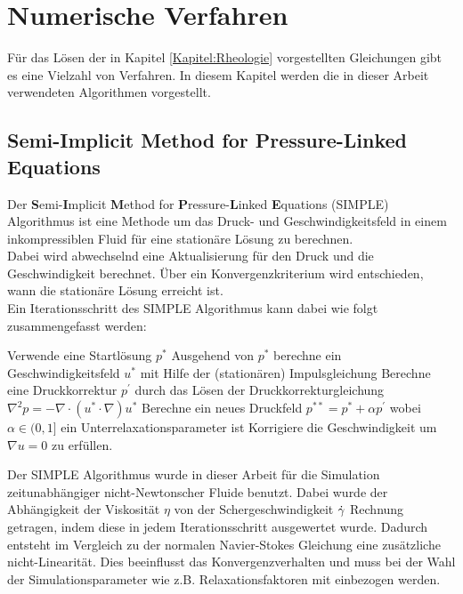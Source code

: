 \section{Numerische Verfahren}
\label{Kapitel:Numerik}
Für das Lösen der in Kapitel \ref{Kapitel:Rheologie} vorgestellten Gleichungen gibt es eine Vielzahl von Verfahren. In diesem Kapitel werden die in dieser Arbeit verwendeten Algorithmen vorgestellt.

\subsection{Semi-Implicit Method for Pressure-Linked Equations}
Der \textbf{S}emi-\textbf{I}mplicit \textbf{M}ethod for \textbf{P}ressure-\textbf{L}inked \textbf{E}quations (SIMPLE) Algorithmus \cite{cfd} ist eine Methode um das Druck- und Geschwindigkeitsfeld in einem inkompressiblen Fluid für eine stationäre Lösung zu berechnen.\\
Dabei wird abwechselnd eine Aktualisierung für den Druck und die Ge\-schwin\-dig\-keit berechnet. Über ein Konvergenzkriterium wird entschieden, wann die stationäre Lösung erreicht ist.\\
Ein Iterationsschritt des SIMPLE Algorithmus kann dabei wie folgt zusammengefasst werden:
\begin{outline}[enumerate]
    \1 Verwende eine Startlösung $p^*$
    \1 Ausgehend von $p^*$ berechne ein Geschwindigkeitsfeld $u^*$ mit Hilfe der (stationären) Impulsgleichung
    \1 Berechne eine Druckkorrektur $p^{'}$ durch das Lösen der Druckkorrekturgleichung $\nabla^2p=-\nabla \cdot \left( u^*\cdot\nabla \right)u^*$
    \1 Berechne ein neues Druckfeld $p^{**}=p^*+\alpha p^{'}$ wobei $\alpha \in (0,1]$ ein Unterrelaxationsparameter ist
    \1 Korrigiere die Geschwindigkeit um $\nabla u=0$ zu erfüllen.
\end{outline}

Der SIMPLE Algorithmus wurde in dieser Arbeit für die Simulation zeitunabhängiger nicht-Newtonscher Fluide benutzt. Dabei wurde der Ab\-hän\-gig\-keit der Viskosität $\eta$ von der Schergeschwindigkeit $\dot\gamma$ Rechnung getragen, indem diese in jedem Iterationsschritt ausgewertet wurde. Dadurch ent\-steht im Vergleich zu der normalen Navier-Stokes Gleichung eine zu\-sätz\-liche nicht-Linearität. Dies beeinflusst das Konvergenzverhalten und muss bei der Wahl der Simulationsparameter wie z.B. Relaxationsfaktoren mit einbezogen werden.

